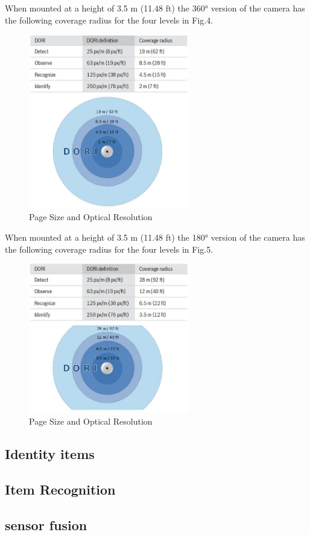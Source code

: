 When mounted at a height of 3.5 m (11.48 ft) the 360° version of the camera has the following coverage radius for the four levels in Fig.4.
\begin{figure}[htbp]
\centerline{\includegraphics[width=7cm,scale=0.8]{camera360.jpg}}
\caption{Page Size and Optical Resolution}
\label{fig}
\end{figure}

When mounted at a height of 3.5 m (11.48 ft) the 180° version of the camera has the following coverage radius for the four levels in Fig.5.
\begin{figure}[htbp]
\centerline{\includegraphics[width=7cm,scale=0.8]{camera180.jpg}}
\caption{Page Size and Optical Resolution}
\label{fig}
\end{figure}

\subsection{Identity items}

\subsection{Item Recognition}

\subsection{sensor fusion}
